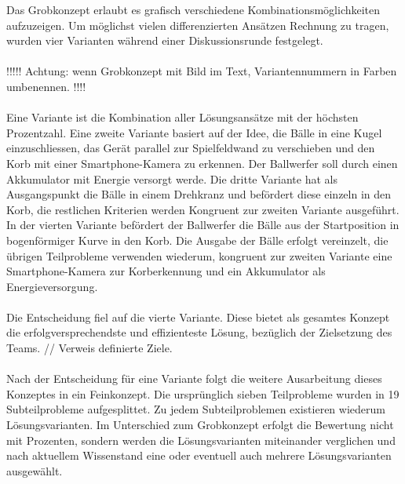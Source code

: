 Das Grobkonzept erlaubt es grafisch verschiedene Kombinationsmöglichkeiten aufzuzeigen. Um möglichst vielen differenzierten Ansätzen Rechnung zu tragen, wurden vier Varianten während einer Diskussionsrunde festgelegt.\\\\ 
!!!!! Achtung: wenn Grobkonzept mit Bild im Text, Variantennummern in Farben umbenennen. !!!!\\\\
Eine Variante ist die Kombination aller Lösungsansätze mit der höchsten Prozentzahl. Eine zweite Variante basiert auf der Idee, die Bälle in eine Kugel einzuschliessen, das Gerät parallel zur Spielfeldwand zu verschieben und den Korb mit einer Smartphone-Kamera zu erkennen. Der Ballwerfer soll durch einen Akkumulator mit Energie versorgt werde. Die dritte Variante hat als Ausgangspunkt die Bälle in einem Drehkranz und befördert diese einzeln in den Korb, die restlichen Kriterien werden Kongruent zur zweiten Variante ausgeführt. In der vierten Variante befördert der Ballwerfer die Bälle aus der Startposition in bogenförmiger Kurve in den Korb. Die Ausgabe der Bälle erfolgt vereinzelt, die übrigen Teilprobleme verwenden wiederum, kongruent zur zweiten Variante eine Smartphone-Kamera zur Korberkennung und ein Akkumulator als Energieversorgung.\\
\\
Die Entscheidung fiel auf die vierte Variante. Diese bietet als gesamtes Konzept die erfolgversprechendste und effizienteste Lösung, bezüglich der Zielsetzung des Teams. // Verweis definierte Ziele.\\
\\
Nach der Entscheidung für eine Variante folgt die weitere Ausarbeitung dieses Konzeptes
in ein Feinkonzept. Die ursprünglich sieben Teilprobleme wurden in 19 Subteilprobleme
aufgesplittet. Zu jedem Subteilproblemen existieren wiederum Lösungsvarianten. Im Unterschied zum Grobkonzept erfolgt die Bewertung nicht mit Prozenten, sondern werden die Lösungsvarianten miteinander verglichen und nach aktuellem Wissenstand eine oder eventuell auch mehrere Lösungsvarianten ausgewählt. 


